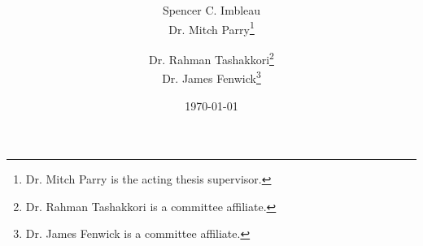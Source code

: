 \title{
\thesistitle
}
\author{
Spencer C. Imbleau\\
Dr. Mitch Parry\thanks{Dr. Mitch Parry is the acting thesis supervisor.} \\
  \and
Dr. Rahman Tashakkori\thanks{Dr. Rahman Tashakkori is a committee affiliate.} \\
Dr. James Fenwick\thanks{Dr. James Fenwick is a committee affiliate.}
}
\date{\today}

\vfill
\maketitle
\vfill